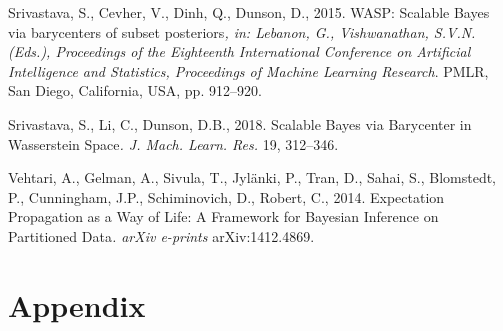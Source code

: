 \documentclass[10pt,a4paper,]{article}
\begin{document}
\hypertarget{ref-srivastava:etal:15}{}
Srivastava, S., Cevher, V., Dinh, Q., Dunson, D., 2015. WASP: Scalable
Bayes via barycenters of subset posteriors\emph{, in: Lebanon, G.,
Vishwanathan, S.V.N. (Eds.), Proceedings of the Eighteenth International
Conference on Artificial Intelligence and Statistics, Proceedings of
Machine Learning Research}. PMLR, San Diego, California, USA, pp.
912--920.

\hypertarget{ref-srivastava:li:dunson:18}{}
Srivastava, S., Li, C., Dunson, D.B., 2018. Scalable Bayes via
Barycenter in Wasserstein Space\emph{. J. Mach. Learn. Res.} 19,
312--346.

\hypertarget{ref-vehtari:etal:14}{}
Vehtari, A., Gelman, A., Sivula, T., Jylänki, P., Tran, D., Sahai, S.,
Blomstedt, P., Cunningham, J.P., Schiminovich, D., Robert, C., 2014.
Expectation Propagation as a Way of Life: A Framework for Bayesian
Inference on Partitioned Data\emph{. arXiv e-prints} arXiv:1412.4869.

\newpage

\renewcommand{\thesection}{\Alph{section}}

\setcounter{section}{0}

\section{Appendix}\label{appendix}
\end{document}
